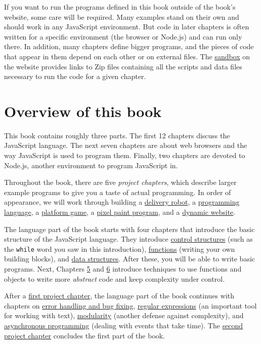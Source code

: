 If you want to run the programs defined in this book outside of the book's website, some care will be required. Many examples stand on their own and should work in any JavaScript environment. But code in later chapters is often written for a specific environment (the browser or Node.js) and can run only there. In addition, many chapters define bigger programs, and the pieces of code that appear in them depend on each other or on external files. The \href{https://eloquentjavascript.net/code}{sandbox} on the website provides links to Zip files containing all the scripts and data files necessary to run the code for a given chapter.

\section{Overview of this book}

This book contains roughly three parts. The first 12 chapters discuss the JavaScript language. The next seven chapters are about web browsers and the way JavaScript is used to program them. Finally, two chapters are devoted to Node.js, another environment to program JavaScript in.

Throughout the book, there are five \emph{project chapters}, which describe larger example programs to give you a taste of actual programming. In order of appearance, we will work through building a \hyperref[robot]{delivery robot}, a \hyperref[language]{programming language}, a \hyperref[game]{platform game}, a \hyperref[paint]{pixel paint program}, and a \hyperref[skillsharing]{dynamic website}.

The language part of the book starts with four chapters that introduce the basic structure of the JavaScript language. They introduce \hyperref[program_structure]{control structures} (such as the \lstinline`while` word you saw in this introduction), \hyperref[functions]{functions} (writing your own building blocks), and \hyperref[data]{data structures}. After these, you will be able to write basic programs. Next, Chapters \hyperref[higher_order]{5} and \hyperref[object]{6} introduce techniques to use functions and objects to write more \emph{abstract} code and keep complexity under control.

After a \hyperref[robot]{first project chapter}, the language part of the book continues with chapters on \hyperref[error]{error handling and bug fixing}, \hyperref[regexp]{regular expressions} (an important tool for working with text), \hyperref[modules]{modularity} (another defense against complexity), and \hyperref[async]{asynchronous programming} (dealing with events that take time). The \hyperref[language]{second project chapter} concludes the first part of the book.

